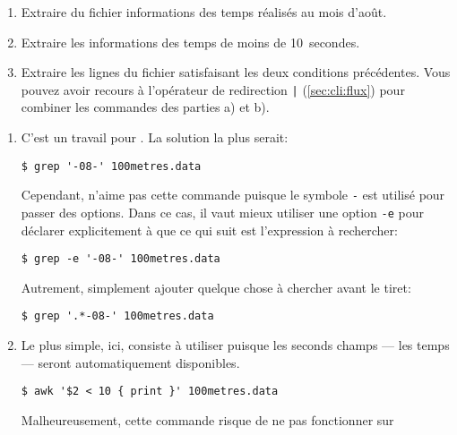 \begin{exercice}
  \begin{enumerate}
  \item Extraire du fichier  informations des
    temps réalisés au mois d'août.
  \item Extraire les informations des temps de moins de 10~secondes.
  \item Extraire les lignes du fichier satisfaisant les deux
    conditions précédentes. Vous pouvez avoir recours à l'opérateur de
    redirection \verb=|= (\autoref{sec:cli:flux}) pour
    combiner les commandes des parties a) et b).
  \end{enumerate}
  \begin{sol}
    \begin{enumerate}
    \item C'est un travail pour . La solution la plus serait:
      \begin{Schunk}
\begin{Verbatim}
$ grep '-08-' 100metres.data
\end{Verbatim}
      \end{Schunk}
      Cependant,  n'aime pas cette commande puisque le
      symbole \verb=-= est utilisé pour passer des options. Dans ce
      cas, il vaut mieux utiliser une option \verb=-e= pour déclarer
      explicitement à  que ce qui suit est l'expression à
      rechercher:
      \begin{Schunk}
\begin{Verbatim}
$ grep -e '-08-' 100metres.data
\end{Verbatim}
      \end{Schunk}
      Autrement, simplement ajouter quelque chose à chercher avant le tiret:
      \begin{Schunk}
\begin{Verbatim}
$ grep '.*-08-' 100metres.data
\end{Verbatim}
      \end{Schunk}
    \item Le plus simple, ici, consiste à utiliser  puisque
      les seconds champs --- les temps --- seront automatiquement
      disponibles.
      \begin{Schunk}
\begin{Verbatim}
$ awk '$2 < 10 { print }' 100metres.data
\end{Verbatim}
      \end{Schunk} %
      Malheureusement, cette commande risque de ne pas fonctionner sur

\end{enumerate}
\end{sol}
\end{exercice}
